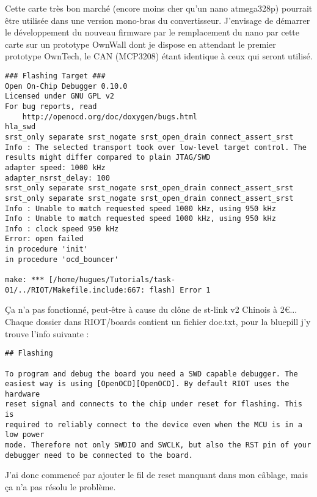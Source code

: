 Cette carte très bon marché (encore moins cher qu'un nano atmega328p) pourrait être
utilisée dans une version mono-bras du convertisseur. J'envisage de démarrer le
développement du nouveau firmware par le remplacement du nano par cette carte sur
un prototype OwnWall dont je dispose en attendant le premier prototype OwnTech, le
CAN (MCP3208) étant identique à ceux qui seront utilisé.

{\scriptsize
\begin{verbatim}
### Flashing Target ###
Open On-Chip Debugger 0.10.0
Licensed under GNU GPL v2
For bug reports, read
	http://openocd.org/doc/doxygen/bugs.html
hla_swd
srst_only separate srst_nogate srst_open_drain connect_assert_srst
Info : The selected transport took over low-level target control. The results might differ compared to plain JTAG/SWD
adapter speed: 1000 kHz
adapter_nsrst_delay: 100
srst_only separate srst_nogate srst_open_drain connect_assert_srst
srst_only separate srst_nogate srst_open_drain connect_assert_srst
Info : Unable to match requested speed 1000 kHz, using 950 kHz
Info : Unable to match requested speed 1000 kHz, using 950 kHz
Info : clock speed 950 kHz
Error: open failed
in procedure 'init' 
in procedure 'ocd_bouncer'

make: *** [/home/hugues/Tutorials/task-01/../RIOT/Makefile.include:667: flash] Error 1
\end{verbatim}
}
Ça n'a pas fonctionné, peut-être à cause du clône de st-link v2 Chinois à 2\euro...\\

Chaque dossier dans RIOT/boards contient un fichier doc.txt, pour la bluepill j'y
trouve l'info suivante :
\begin{verbatim}
## Flashing

To program and debug the board you need a SWD capable debugger. The
easiest way is using [OpenOCD][OpenOCD]. By default RIOT uses the hardware
reset signal and connects to the chip under reset for flashing. This is
required to reliably connect to the device even when the MCU is in a low power
mode. Therefore not only SWDIO and SWCLK, but also the RST pin of your
debugger need to be connected to the board.
\end{verbatim}

J'ai donc commencé par ajouter le fil de reset manquant dans mon câblage, mais ça n'a
pas résolu le problème.\\

